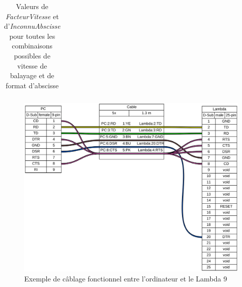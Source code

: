 \documentclass[a4paper, 12pt]{article}
\begin{document}
\begin{longtable}[c]{|c|c|c|c|}
\caption{Valeurs de \emph{FacteurVitesse} et d'\emph{InconnuAbscisse} pour toutes les combinaisons possibles de vitesse de balayage et de format d'abscisse}

\label{tab:ValeursFacteurVitesse}\\
\end{longtable}

\begin{figure}[htb]
		\centering
		\includegraphics[width=1\textwidth]{cableLambda.png}
		\caption{Exemple de câblage fonctionnel entre l'ordinateur et le Lambda 9} %
		\label{fig:cableLambda}
	\end{figure}
\end{document}
